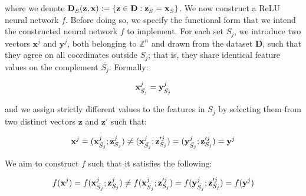 \documentclass{article}
\newcommand{\z}{\textbf{z}}
\newcommand{\x}{\textbf{x}}
\newcommand{\y}{\textbf{y}}
\begin{document}
where we denote $\textbf{D}_{\Bar{S}}(\z,\x):=\{\z\in\mathbf{D}:\z_{\Bar{S}}=\x_{\Bar{S}}\}$. We now construct a ReLU neural network $f$. Before doing so, we specify the functional form that we intend the constructed neural network $f$ to implement. For each set $S_j$, we introduce two vectors $\x^j$ and $\y^j$, both belonging to $\mathbb{Z}^n$ and drawn from the dataset $\mathbf{D}$, such that they agree on all coordinates outside $S_j$; that is, they share identical feature values on the complement $\bar{S_j}$. Formally:



\begin{equation}
    \x^j_{\Bar{S_j}} = \y^j_{\Bar{S_j}}
\end{equation}

and we assign strictly different values to the features in $S_j$ by selecting them from two distinct vectors $\z$ and $\z'$ such that:


\begin{equation}
    \x^j=(\x^j_{\Bar{S_j}};\z^j_{S_j}) \neq (\x^j_{\Bar{S_j}};\z'^j_{S_j})= (\y^j_{\Bar{S_j}};\z'^j_{S_j})=\y^j
\end{equation}

We aim to construct $f$ such that it satisfies the following:


\begin{equation}
f(\x^j)=f(\x^j_{\Bar{S_j}};\z^j_{S_j}) \neq f(\x^j_{\Bar{S_j}};\z'^j_{S_j})= f(\y^j_{\Bar{S_j}};\z'^j_{S_j})=f(\y^j)
\end{equation}

\end{document}
